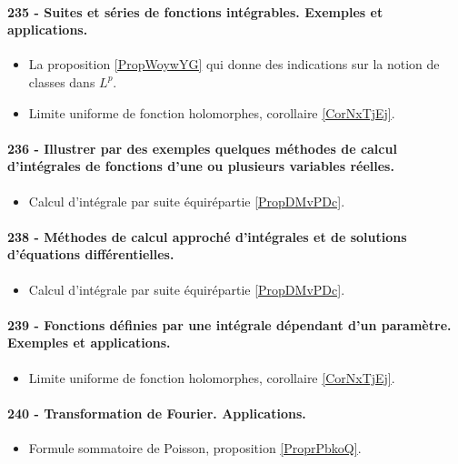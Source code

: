 \paragraph{235 - Suites et séries de fonctions intégrables. Exemples et applications.}
\begin{itemize}
    \item La proposition \ref{PropWoywYG} qui donne des indications sur la notion de classes dans \( L^p\).
\end{itemize}
\begin{itemize}
    \item Limite uniforme de fonction holomorphes, corollaire \ref{CorNxTjEj}.
\end{itemize}
\paragraph{236 - Illustrer par des exemples quelques méthodes de calcul d’intégrales de fonctions d’une ou plusieurs variables réelles.}
\begin{itemize}
    \item Calcul d'intégrale par suite équirépartie \ref{PropDMvPDc}.
\end{itemize}

\paragraph{238 - Méthodes de calcul approché d’intégrales et de solutions d’équations différentielles.}
\begin{itemize}
    \item Calcul d'intégrale par suite équirépartie \ref{PropDMvPDc}.
\end{itemize}

\paragraph{239 - Fonctions définies par une intégrale dépendant d’un paramètre. Exemples et applications.}
\begin{itemize}
    \item Limite uniforme de fonction holomorphes, corollaire \ref{CorNxTjEj}.
\end{itemize}

\paragraph{240 - Transformation de Fourier. Applications.}
\begin{itemize}
    \item Formule sommatoire de Poisson, proposition \ref{ProprPbkoQ}.
\end{itemize}
